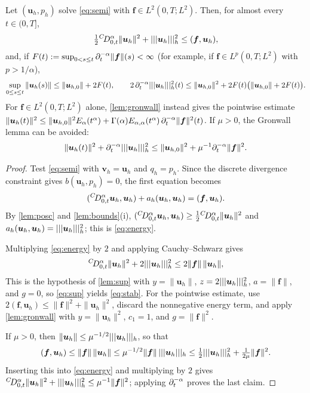 \begin{theorem}\label{thm:stab}
Let $(\bm u_h,p_h)$ solve \eqref{eq:semi} with $\bm f\in L^2(0,T;L^2)$. Then, for almost every $t\in(0,T]$,
\begin{equation}\label{eq:energy}
\tfrac12{}^{C}\!D_{0,t}^{\alpha}\|\bm u_h\|^2+|||\bm u_h|||_h^2\le(\bm f,\bm u_h),
\end{equation}
and, if $F(t):=\sup_{0<s\le t}\partial_t^{-\alpha}\|\bm f\|(s)<\infty$ (for example, if $\bm f\in L^p(0,T;L^2)$ with $p>1/\alpha$),
\begin{equation}\label{eq:stab}
\sup_{0\le s\le t}\|\bm u_h(s)\|\le\|\bm u_{h,0}\|+2F(t),\qquad
2\,\partial_t^{-\alpha}|||\bm u_h|||_h^2(t)\le\|\bm u_{h,0}\|^2+2F(t)\bigl(\|\bm u_{h,0}\|+2F(t)\bigr).
\end{equation}
For $\bm f\in L^2(0,T;L^2)$ alone, \cref{lem:gronwall} instead gives the pointwise estimate
$\|\bm u_h(t)\|^2\le\|\bm u_{h,0}\|^2E_\alpha(t^\alpha)+\Gamma(\alpha)E_{\alpha,\alpha}(t^\alpha)\,\partial_t^{-\alpha}\|\bm f\|^2(t)$.
If $\mu>0$, the Gronwall lemma can be avoided:
\[
\|\bm u_h(t)\|^2+\partial_t^{-\alpha}|||\bm u_h|||_h^2\le\|\bm u_{h,0}\|^2+\mu^{-1}\partial_t^{-\alpha}\|\bm f\|^2 .
\]
\end{theorem}
\begin{proof}
Test \eqref{eq:semi} with $\bm v_h=\bm u_h$ and $q_h=p_h$. Since the discrete divergence constraint gives $b(\bm u_h,p_h)=0$, the first equation becomes
\[
({}^{C}\!D_{0,t}^{\alpha}\bm u_h,\bm u_h)+a_h(\bm u_h,\bm u_h)=(\bm f,\bm u_h).
\]
By \cref{lem:posc} and \cref{lem:bounds}(i), $({}^{C}\!D_{0,t}^{\alpha}\bm u_h,\bm u_h)\ge\frac12{}^{C}\!D_{0,t}^{\alpha}\|\bm u_h\|^2$ and $a_h(\bm u_h,\bm u_h)=|||\bm u_h|||_h^2$; this is \eqref{eq:energy}.

Multiplying \eqref{eq:energy} by $2$ and applying Cauchy--Schwarz gives
\[
{}^{C}\!D_{0,t}^{\alpha}\|\bm u_h\|^2+2|||\bm u_h|||_h^2\le2\|\bm f\|\,\|\bm u_h\| ,
\]
This is the hypothesis of \cref{lem:sup} with $y=\|\bm u_h\|$, $z=2|||\bm u_h|||_h^2$, $a=\|\bm f\|$, and $g=0$, so \eqref{eq:sup} yields \eqref{eq:stab}. For the pointwise estimate, use $2(\bm f,\bm u_h)\le\|\bm f\|^2+\|\bm u_h\|^2$, discard the nonnegative energy term, and apply \cref{lem:gronwall} with $y=\|\bm u_h\|^2$, $c_1=1$, and $g=\|\bm f\|^2$.

If $\mu>0$, then $\|\bm u_h\|\le\mu^{-1/2}|||\bm u_h|||_h$, so that
\[
(\bm f,\bm u_h)\le\|\bm f\|\,\|\bm u_h\|\le\mu^{-1/2}\|\bm f\|\,|||\bm u_h|||_h\le\tfrac12|||\bm u_h|||_h^2+\tfrac1{2\mu}\|\bm f\|^2 .
\]
Inserting this into \eqref{eq:energy} and multiplying by $2$ gives ${}^{C}\!D_{0,t}^{\alpha}\|\bm u_h\|^2+|||\bm u_h|||_h^2\le\mu^{-1}\|\bm f\|^2$; applying $\partial_t^{-\alpha}$ proves the last claim.
\end{proof}
